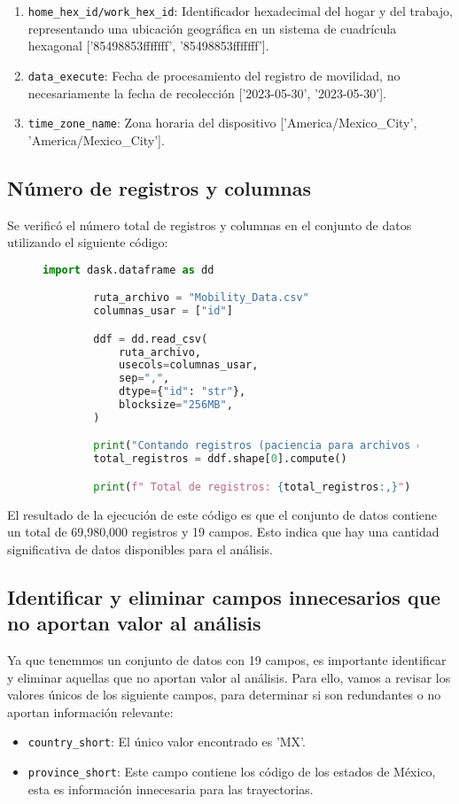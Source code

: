 \begin{enumerate}[leftmargin=*, align=left, noitemsep]
    \item \texttt{home\_hex\_id/work\_hex\_id}: Identificador hexadecimal del hogar y del trabajo, representando una ubicación geográfica en un sistema de cuadrícula hexagonal ['85498853fffffff', '85498853fffffff'].
    \item \texttt{data\_execute}: Fecha de procesamiento del registro de movilidad, no necesariamente la fecha de recolección ['2023-05-30', '2023-05-30'].
    \item \texttt{time\_zone\_name}: Zona horaria del dispositivo ['America\textdollar/Mexico\_City', 'America/Mexico\_City'].
\end{enumerate}

\newpage
\subsection{Número de registros y columnas}
\noindent Se verificó el número total de registros y columnas en el conjunto de datos utilizando el siguiente código:

\begin{figure}[h]
    \centering
    \begin{lstlisting}[language=Python, breaklines=true]
        import dask.dataframe as dd

        ruta_archivo = "Mobility_Data.csv" 
        columnas_usar = ["id"]  

        ddf = dd.read_csv(
            ruta_archivo,
            usecols=columnas_usar, 
            sep=",",             
            dtype={"id": "str"},  
            blocksize="256MB",   
        )

        print("Contando registros (paciencia para archivos grandes)...")
        total_registros = ddf.shape[0].compute() 

        print(f" Total de registros: {total_registros:,}")
    \end{lstlisting}
\end{figure}


\noindent El resultado de la ejecución de este código es que el conjunto de datos contiene un total de 69,980,000 registros y 19 campos. Esto indica que hay una cantidad significativa de datos disponibles para el análisis.

\subsection{Identificar y eliminar campos innecesarios que no aportan valor al análisis}
\noindent Ya que tenemmos un conjunto de datos con 19 campos, es importante identificar y eliminar aquellas que no aportan valor al análisis. Para ello, vamos a revisar los valores únicos de los siguiente campos, para determinar si son redundantes o no aportan información relevante:
\begin{itemize}
    \item \texttt{country\_short}: El único valor encontrado es 'MX'.
    \item \texttt{province\_short}: Este campo contiene los código de los estados de México, esta es información innecesaria para las trayectorias.
\end{itemize}

